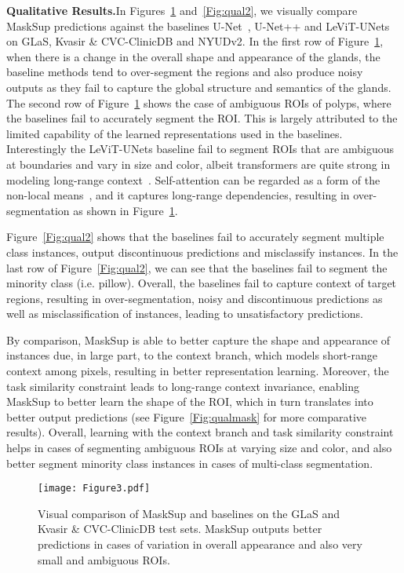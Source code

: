 \documentclass{bmvc2k}
\begin{document}
\medskip\noindent\textbf{Qualitative Results.}\quad In Figures~\ref{Fig:qual1} and~\ref{Fig:qual2}, we visually compare MaskSup predictions against the baselines U-Net~\cite{ronneberger2015u}, U-Net++\cite{zhou2019unet++} and LeViT-UNets~\cite{xu2021levit} on GLaS, Kvasir \& CVC-ClinicDB and NYUDv2. In the first row of Figure~\ref{Fig:qual1}, when there is a change in the overall shape and appearance of the glands, the baseline methods tend to over-segment the regions and also produce noisy outputs as they fail to capture the global structure and semantics of the glands. The second row of Figure~\ref{Fig:qual1} shows the case of ambiguous ROIs of polyps, where the baselines fail to accurately segment the ROI. This is largely attributed to the limited capability of the learned representations used in the baselines. Interestingly the LeViT-UNets baseline fail to segment ROIs that are ambiguous at boundaries and vary in size and color, albeit transformers are quite strong in modeling long-range context~\cite{dosovitskiy2020vit,wang2020axial}.  Self-attention can be regarded as a form of the non-local means~\cite{buades2005non}, and it captures long-range dependencies, resulting in over-segmentation as shown in Figure~\ref{Fig:qual1}.

Figure~\ref{Fig:qual2} shows that the baselines fail to accurately segment multiple class instances, output discontinuous predictions and misclassify instances. In the last row of Figure~\ref{Fig:qual2}, we can see that the baselines fail to segment the minority class (i.e. pillow). Overall, the baselines fail to capture context of target regions, resulting in over-segmentation, noisy and discontinuous predictions as well as misclassification of instances, leading to unsatisfactory predictions.

By comparison, MaskSup is able to better capture the shape and appearance of instances due, in large part, to the context branch, which models short-range context among pixels, resulting in better representation learning. Moreover, the task similarity constraint leads to long-range context invariance, enabling MaskSup to better learn the shape of the ROI, which in turn translates into better output predictions (see Figure~\ref{Fig:qualmask} for more comparative results). Overall, learning with the context branch and task similarity constraint helps in cases of segmenting ambiguous ROIs at varying size and color, and also better segment minority class instances in cases of multi-class segmentation.

\begin{figure}[!htb]
\centering
\texttt{[image: Figure3.pdf]}
\caption{Visual comparison of MaskSup and baselines on the GLaS and Kvasir \& CVC-ClinicDB test sets. MaskSup outputs better predictions in cases of variation in overall appearance and also very small and ambiguous ROIs.}
\label{Fig:qual1}
\end{figure}
\end{document}
